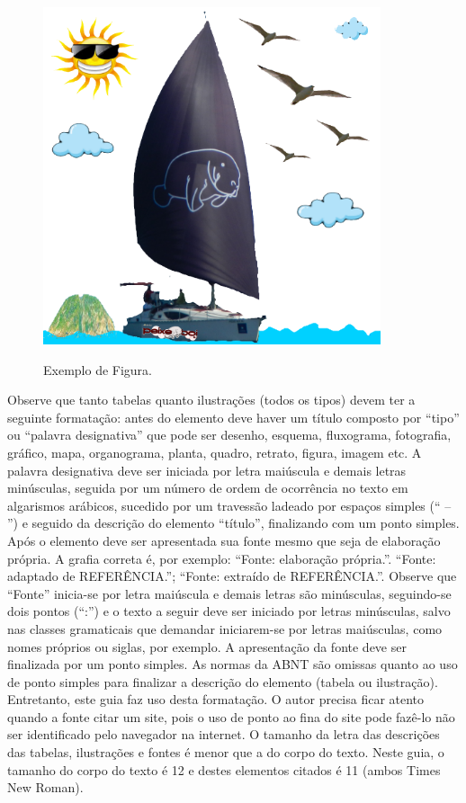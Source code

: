 \begin{enumerate}[label=\alph*)]
\begin{figure}[htbp]
    \caption{Exemplo de Figura.}
	\centering
		\includegraphics{imagens/barco.png}
	\label{fig:barco}
\end{figure}

Observe que tanto tabelas quanto ilustrações (todos os tipos) devem ter a seguinte formatação: antes do elemento deve haver um título composto por “tipo” ou “palavra designativa” que pode ser desenho, esquema, fluxograma, fotografia, gráfico, mapa, organograma, planta, quadro, retrato, figura, imagem etc. A palavra designativa deve ser iniciada por letra maiúscula e demais letras minúsculas, seguida por um número de ordem de ocorrência no texto em algarismos arábicos, sucedido por um travessão ladeado por espaços simples (“ – ”) e seguido da descrição do elemento “título”, finalizando com um ponto simples. Após o elemento deve ser apresentada sua fonte mesmo que seja de elaboração própria. A grafia correta é, por exemplo: “Fonte: elaboração própria.”. “Fonte: adaptado de REFERÊNCIA.”; “Fonte: extraído de REFERÊNCIA.”. Observe que “Fonte” inicia-se por letra maiúscula e demais letras são minúsculas, seguindo-se dois pontos (“:”) e o texto a seguir deve ser iniciado por letras minúsculas, salvo nas classes gramaticais que demandar iniciarem-se por letras maiúsculas, como nomes próprios ou siglas, por exemplo. A apresentação da fonte deve ser finalizada por um ponto simples. As normas da ABNT são omissas quanto ao uso de ponto simples para finalizar a descrição do elemento (tabela ou ilustração). Entretanto, este guia faz uso desta formatação. O autor precisa ficar atento quando a fonte citar um site, pois o uso de ponto ao fina do site pode fazê-lo não ser identificado pelo navegador na internet. O tamanho da letra das descrições das tabelas, ilustrações e fontes é menor que a do corpo do texto. Neste guia, o tamanho do corpo do texto é 12 e destes elementos citados é 11 (ambos Times New Roman).


\end{enumerate}
